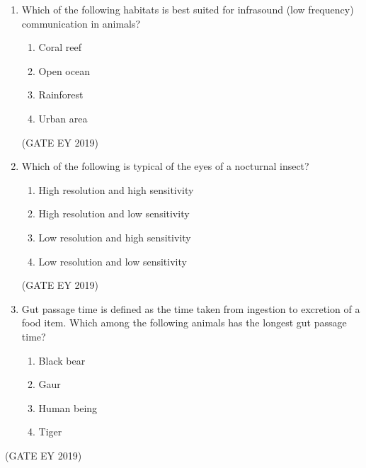 \documentclass[journal,12pt,onecolumn]{IEEEtran}
\theoremstyle{remark}
\begin{document}
\begin{enumerate}[leftmargin=*]
\begin{multicols}{2}
\begin{enumerate}[nosep]
\item Heterochrony
\item Heterotopy
\item Homochrony
\item Homotopy
\end{enumerate}
\end{multicols}
\hfill{(GATE EY 2019)}
\item Which of the following habitats is best suited for infrasound (low frequency) communication in animals?

\begin{multicols}{2}
\begin{enumerate}[nosep]
\item Coral reef
\item Open ocean
\item Rainforest
\item Urban area
\end{enumerate}
\end{multicols}
\hfill{(GATE EY 2019)}
\item Which of the following is typical of the eyes of a nocturnal insect?

\begin{enumerate}[nosep]
\item High resolution and high sensitivity
\item High resolution and low sensitivity
\item Low resolution and high sensitivity
\item Low resolution and low sensitivity
\end{enumerate}
\hfill{(GATE EY 2019)}
\item Gut passage time is defined as the time taken from ingestion to excretion of a food item. Which among the following animals has the longest gut passage time?

\begin{multicols}{2}
\begin{enumerate}[nosep]
\item Black bear
\item Gaur
\item Human being
\item Tiger
\end{enumerate}
\end{multicols}

\end{enumerate}
\hfill{(GATE EY 2019)}
\end{document}
